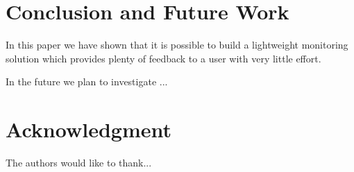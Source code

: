 \documentclass[conference]{IEEEtran}
\begin{document}


\section{Conclusion and Future Work}

In this paper we have shown that it is possible to build a lightweight monitoring solution which provides plenty of feedback to a user with very little effort. 

In the future we plan to investigate ...





\section*{Acknowledgment}


The authors would like to thank...










\end{document}
